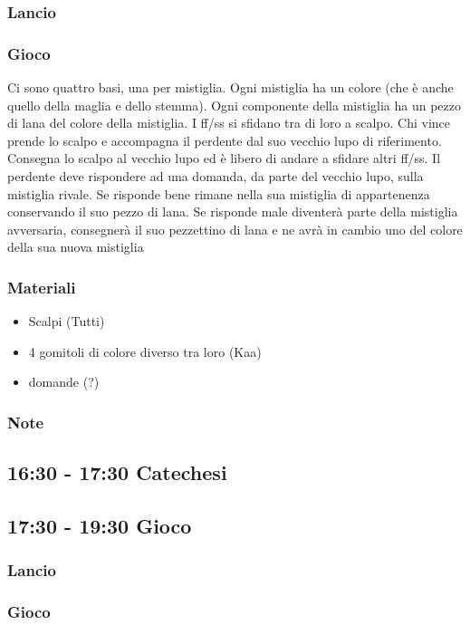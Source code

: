 \documentclass[../main.tex]{subfiles}
\begin{document}
       \subsubsection{Lancio}
       \subsubsection{Gioco}
       Ci sono quattro basi, una per mistiglia. Ogni mistiglia ha un colore (che è anche quello della maglia e dello stemma). Ogni componente della mistiglia ha un pezzo di lana del colore della mistiglia. I ff/ss si sfidano tra di loro a scalpo. Chi vince prende lo scalpo e accompagna il perdente dal suo vecchio lupo di riferimento. Consegna lo scalpo al vecchio lupo ed è libero di andare a sfidare altri ff/ss. Il perdente deve rispondere ad una domanda, da parte del vecchio lupo, sulla mistiglia rivale. Se risponde bene rimane nella sua mistiglia di appartenenza conservando il suo pezzo di lana. Se risponde male diventerà parte della mistiglia avversaria, consegnerà il suo pezzettino di lana e ne avrà in cambio uno del colore della sua nuova mistiglia
       \subsubsection{Materiali}
       \begin{itemize}
           \item Scalpi (Tutti)
           \item 4 gomitoli di colore diverso tra loro (Kaa)
           \item domande (?)
       \end{itemize}
       \subsubsection{Note}
    \subsection{16:30 - 17:30 Catechesi}   
    \subsection{17:30 - 19:30 Gioco}
        \subsubsection{Lancio}
        \subsubsection{Gioco}
\end{document}
